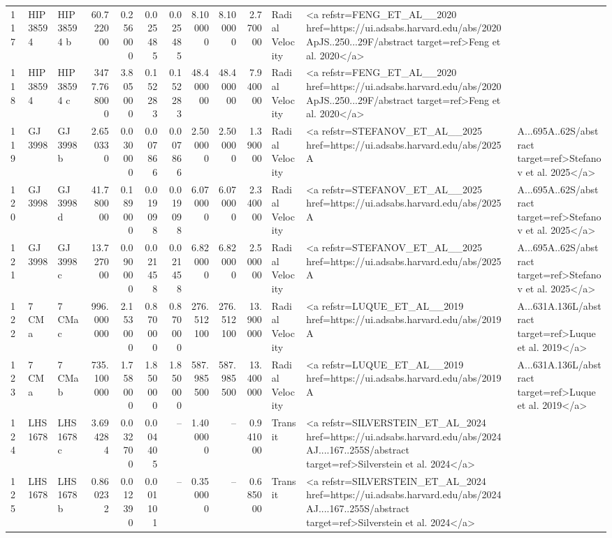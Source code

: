 \begin{tabular}{lllrrrrrrrll}
117 & HIP 38594 & HIP 38594 b & 60.722000 & 0.256000 & 0.025485 & 0.025485 & 8.100000 & 8.100000 & 2.770000 & Radial Velocity & <a refstr=FENG_ET_AL__2020 href=https://ui.adsabs.harvard.edu/abs/2020ApJS..250...29F/abstract target=ref>Feng et al. 2020</a> \\
118 & HIP 38594 & HIP 38594 c & 3477.768000 & 3.805000 & 0.152283 & 0.152283 & 48.400000 & 48.400000 & 7.940000 & Radial Velocity & <a refstr=FENG_ET_AL__2020 href=https://ui.adsabs.harvard.edu/abs/2020ApJS..250...29F/abstract target=ref>Feng et al. 2020</a> \\
119 & GJ 3998 & GJ 3998 b & 2.650330 & 0.030000 & 0.007866 & 0.007866 & 2.500000 & 2.500000 & 1.390000 & Radial Velocity & <a refstr=STEFANOV_ET_AL__2025 href=https://ui.adsabs.harvard.edu/abs/2025A&A...695A..62S/abstract target=ref>Stefanov et al. 2025</a> \\
120 & GJ 3998 & GJ 3998 d & 41.780000 & 0.189000 & 0.019098 & 0.019098 & 6.070000 & 6.070000 & 2.340000 & Radial Velocity & <a refstr=STEFANOV_ET_AL__2025 href=https://ui.adsabs.harvard.edu/abs/2025A&A...695A..62S/abstract target=ref>Stefanov et al. 2025</a> \\
121 & GJ 3998 & GJ 3998 c & 13.727000 & 0.090000 & 0.021458 & 0.021458 & 6.820000 & 6.820000 & 2.500000 & Radial Velocity & <a refstr=STEFANOV_ET_AL__2025 href=https://ui.adsabs.harvard.edu/abs/2025A&A...695A..62S/abstract target=ref>Stefanov et al. 2025</a> \\
122 & 7 CMa & 7 CMa c & 996.000000 & 2.153000 & 0.870000 & 0.870000 & 276.512100 & 276.512100 & 13.900000 & Radial Velocity & <a refstr=LUQUE_ET_AL__2019 href=https://ui.adsabs.harvard.edu/abs/2019A&A...631A.136L/abstract target=ref>Luque et al. 2019</a> \\
123 & 7 CMa & 7 CMa b & 735.100000 & 1.758000 & 1.850000 & 1.850000 & 587.985500 & 587.985500 & 13.400000 & Radial Velocity & <a refstr=LUQUE_ET_AL__2019 href=https://ui.adsabs.harvard.edu/abs/2019A&A...631A.136L/abstract target=ref>Luque et al. 2019</a> \\
124 & LHS 1678 & LHS 1678 c & 3.694284 & 0.032700 & 0.004405 & -- & 1.400000 & -- & 0.941000 & Transit & <a refstr=SILVERSTEIN_ET_AL_2024 href=https://ui.adsabs.harvard.edu/abs/2024AJ....167..255S/abstract target=ref>Silverstein et al. 2024</a> \\
125 & LHS 1678 & LHS 1678 b & 0.860232 & 0.012390 & 0.001101 & -- & 0.350000 & -- & 0.685000 & Transit & <a refstr=SILVERSTEIN_ET_AL_2024 href=https://ui.adsabs.harvard.edu/abs/2024AJ....167..255S/abstract target=ref>Silverstein et al. 2024</a> \\

\end{tabular}
